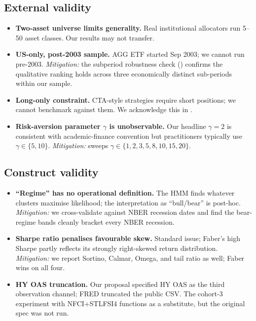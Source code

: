 \documentclass[11pt]{article}
\theoremstyle{plain1}
\theoremstyle{definition1}
\newcommand{\1}{\mathbf{1}}
\begin{document}
\subsection{External validity}
\begin{itemize}[leftmargin=1.5em,itemsep=2pt]
  \item \textbf{Two-asset universe limits generality.} Real institutional allocators run 5--50 asset classes. Our results may not transfer.
  \item \textbf{US-only, post-2003 sample.} AGG ETF started Sep 2003; we cannot run pre-2003. \emph{Mitigation:} the subperiod robustness check () confirms the qualitative ranking holds across three economically distinct sub-periods within our sample.
  \item \textbf{Long-only constraint.} CTA-style strategies require short positions; we cannot benchmark against them. We acknowledge this in .
  \item \textbf{Risk-aversion parameter $\gamma$ is unobservable.} Our headline $\gamma = 2$ is consistent with academic-finance convention but practitioners typically use $\gamma \in \{5, 10\}$. \emph{Mitigation:}  sweeps $\gamma \in \{1, 2, 3, 5, 8, 10, 15, 20\}$.
\end{itemize}

\subsection{Construct validity}
\begin{itemize}[leftmargin=1.5em,itemsep=2pt]
  \item \textbf{``Regime'' has no operational definition.} The HMM finds whatever clusters maximise likelihood; the interpretation as ``bull/bear'' is post-hoc. \emph{Mitigation:} we cross-validate against NBER recession dates and find the bear-regime bands cleanly bracket every NBER recession.
  \item \textbf{Sharpe ratio penalises favourable skew.} Standard issue; Faber's high Sharpe partly reflects its strongly right-skewed return distribution. \emph{Mitigation:} we report Sortino, Calmar, Omega, and tail ratio as well; Faber wins on all four.
  \item \textbf{HY OAS truncation.} Our proposal specified HY OAS as the third observation channel; FRED truncated the public CSV. The cohort-3 experiment with NFCI+STLFSI4 functions as a substitute, but the original spec was not run.
\end{itemize}
\end{document}

